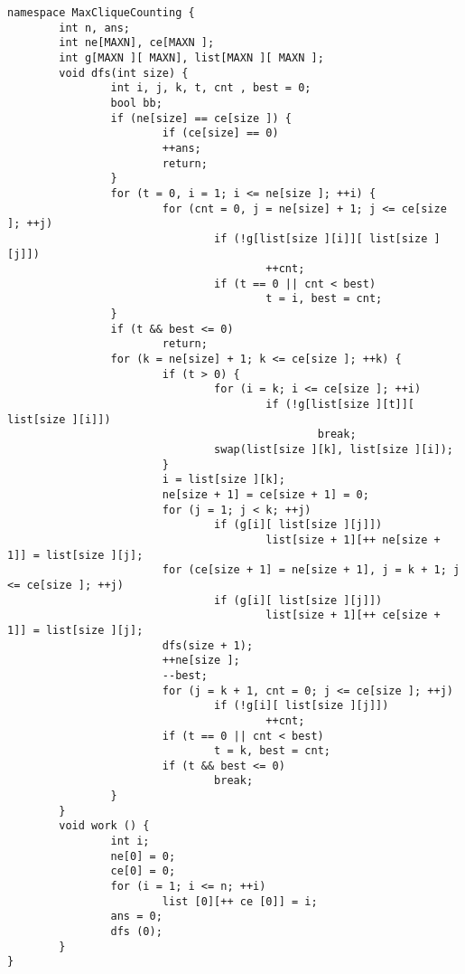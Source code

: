\begin{lstlisting}
namespace MaxCliqueCounting {
        int n, ans;
        int ne[MAXN], ce[MAXN ];
        int g[MAXN ][ MAXN], list[MAXN ][ MAXN ];
        void dfs(int size) {
                int i, j, k, t, cnt , best = 0;
                bool bb;
                if (ne[size] == ce[size ]) {
                        if (ce[size] == 0)
                        ++ans;
                        return;
                }
                for (t = 0, i = 1; i <= ne[size ]; ++i) {
                        for (cnt = 0, j = ne[size] + 1; j <= ce[size ]; ++j)
                                if (!g[list[size ][i]][ list[size ][j]])
                                        ++cnt;
                                if (t == 0 || cnt < best)
                                        t = i, best = cnt;
                }
                if (t && best <= 0)
                        return;
                for (k = ne[size] + 1; k <= ce[size ]; ++k) {
                        if (t > 0) {
                                for (i = k; i <= ce[size ]; ++i)
                                        if (!g[list[size ][t]][ list[size ][i]])
                                                break;
                                swap(list[size ][k], list[size ][i]);
                        }
                        i = list[size ][k];
                        ne[size + 1] = ce[size + 1] = 0;
                        for (j = 1; j < k; ++j)
                                if (g[i][ list[size ][j]])
                                        list[size + 1][++ ne[size + 1]] = list[size ][j];
                        for (ce[size + 1] = ne[size + 1], j = k + 1; j <= ce[size ]; ++j)
                                if (g[i][ list[size ][j]])
                                        list[size + 1][++ ce[size + 1]] = list[size ][j];
                        dfs(size + 1);
                        ++ne[size ];
                        --best;
                        for (j = k + 1, cnt = 0; j <= ce[size ]; ++j)
                                if (!g[i][ list[size ][j]])
                                        ++cnt;
                        if (t == 0 || cnt < best)
                                t = k, best = cnt;
                        if (t && best <= 0)
                                break;
                }
        }
        void work () {
                int i;
                ne[0] = 0;
                ce[0] = 0;
                for (i = 1; i <= n; ++i)
                        list [0][++ ce [0]] = i;
                ans = 0;
                dfs (0);
        }
}
\end{lstlisting}
